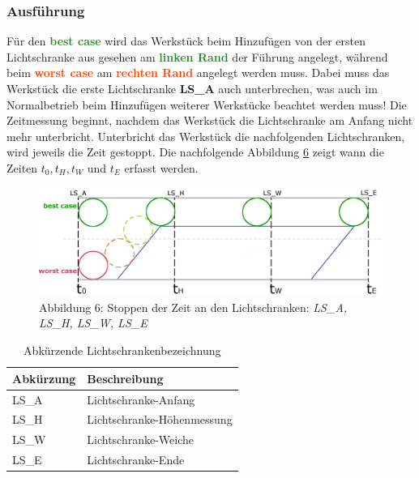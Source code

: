 \documentclass[a4paper, 11pt]{article}
\begin{document}
\subsubsection{Ausführung}
Für den \textbf{\textcolor{ForestGreen}{best case}} wird das Werkstück beim Hinzufügen von der ersten Lichtschranke aus gesehen am \textbf{\textcolor{ForestGreen}{linken Rand}} der Führung angelegt, während beim \textbf{\textcolor{OrangeRed}{worst case}} am \textbf{\textcolor{OrangeRed}{rechten Rand}} angelegt werden muss. Dabei muss das Werkstück die erste Lichtschranke \textbf{LS\_A} auch unterbrechen, was auch im Normalbetrieb beim Hinzufügen weiterer Werkstücke beachtet werden muss! Die Zeitmessung beginnt, nachdem das Werkstück die Lichtschranke am Anfang nicht mehr unterbricht. Unterbricht das Werkstück die nachfolgenden Lichtschranken, wird jeweils die Zeit gestoppt. Die nachfolgende Abbildung \hyperref[sec:Messpunkte]{6} zeigt wann die Zeiten $t_0, t_H, t_W$ und $t_E$ erfasst werden.

\begin{figure}[h]
\centering 
    \includegraphics[scale=0.6]{images/Zeitmessung_Platzierung.png}
    \caption*{Abbildung 6: Stoppen der Zeit an den Lichtschranken: \textit{LS\_A, LS\_H, LS\_W, LS\_E}}
    \label{sec:Messpunkte}
\end{figure}

\begin{table}[H]
\centering
    \begin{tabularx}{\textwidth}{|X|X|}
        \hline
        \textbf{Abkürzung}&\textbf{Beschreibung}\\
        \hline
        LS\_A & Lichtschranke-Anfang\\
        \hline
        LS\_H & Lichtschranke-Höhenmessung\\
        \hline
        LS\_W & Lichtschranke-Weiche\\
        \hline
        LS\_E & Lichtschranke-Ende\\
        \hline
    \end{tabularx}
\caption{Abkürzende Lichtschrankenbezeichnung}
\label{lbdesc}
\end{table}
\end{document}
